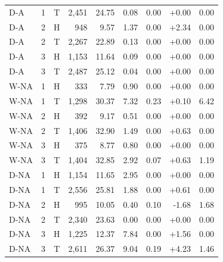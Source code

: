 \begin{table}[htbp]
\begin{tabular}{llcrrrrrr}
D-A & 1 & T & 2,451 & 24.75 & 0.08 & 0.00 & +0.00 & 0.00\\
D-A & 2 & H & 948 & 9.57 & 1.37 & 0.00 & +2.34 & 0.00\\
D-A & 2 & T & 2,267 & 22.89 & 0.13 & 0.00 & +0.00 & 0.00\\
D-A & 3 & H & 1,153 & 11.64 & 0.09 & 0.00 & +0.00 & 0.00\\
D-A & 3 & T & 2,487 & 25.12 & 0.04 & 0.00 & +0.00 & 0.00\\
W-NA & 1 & H & 333 & 7.79 & 0.90 & 0.00 & +0.00 & 0.00\\
W-NA & 1 & T & 1,298 & 30.37 & 7.32 & 0.23 & +0.10 & 6.42\\
W-NA & 2 & H & 392 & 9.17 & 0.51 & 0.00 & +0.00 & 0.00\\
W-NA & 2 & T & 1,406 & 32.90 & 1.49 & 0.00 & +0.63 & 0.00\\
W-NA & 3 & H & 375 & 8.77 & 0.80 & 0.00 & +0.00 & 0.00\\
W-NA & 3 & T & 1,404 & 32.85 & 2.92 & 0.07 & +0.63 & 1.19\\
D-NA & 1 & H & 1,154 & 11.65 & 2.95 & 0.00 & +0.00 & 0.00\\
D-NA & 1 & T & 2,556 & 25.81 & 1.88 & 0.00 & +0.61 & 0.00\\
D-NA & 2 & H & 995 & 10.05 & 0.40 & 0.10 & -1.68 & 1.68\\
D-NA & 2 & T & 2,340 & 23.63 & 0.00 & 0.00 & +0.00 & 0.00\\
D-NA & 3 & H & 1,225 & 12.37 & 7.84 & 0.00 & +1.56 & 0.00\\
D-NA & 3 & T & 2,611 & 26.37 & 9.04 & 0.19 & +4.23 & 1.46\\
\bottomrule
\end{tabular}
\end{table}
